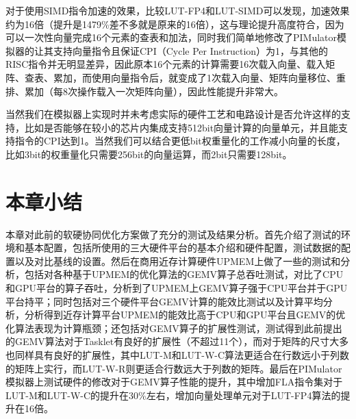 对于使用SIMD指令加速的效果，比较LUT-FP4和LUT-SIMD可以发现，加速效果约为16倍（提升是1479\%差不多就是原来的16倍），这与理论提升高度符合，因为可以一次性向量完成16个元素的查表和加法，同时我们简单地修改了PIMulator模拟器的让其支持向量指令且保证CPI（Cycle Per Instruction）为1，与其他的RISC指令并无明显差异，因此原本16个元素的计算需要16次载入向量、载入矩阵、查表、累加，而使用向量指令后，就变成了1次载入向量、矩阵向量移位、重排、累加（每8次操作载入一次矩阵向量），因此性能提升非常大。

当然我们在模拟器上实现时并未考虑实际的硬件工艺和电路设计是否允许这样的支持，比如是否能够在较小的芯片内集成支持512bit向量计算的向量单元，并且能支持指令的CPI达到1。当然我们可以结合更低bit权重量化的工作减小向量的长度，比如3bit的权重量化只需要256bit的向量运算，而2bit只需要128bit。

\section{本章小结}
本章对此前的软硬协同优化方案做了充分的测试及结果分析。首先介绍了测试的环境和基本配置，包括所使用的三大硬件平台的基本介绍和硬件配置，测试数据的配置以及对比基线的设置。然后在商用近存计算硬件UPMEM上做了一些的测试和分析，包括对各种基于UPMEM的优化算法的GEMV算子总吞吐测试，对比了CPU和GPU平台的算子吞吐，分析到了UPMEM上GEMV算子强于CPU平台并于GPU平台持平；同时包括对三个硬件平台GEMV计算的能效比测试以及计算平均分析，分析得到近存计算平台UPMEM的能效比高于CPU和GPU平台且GEMV的优化算法表现为计算瓶颈；还包括对GEMV算子的扩展性测试，测试得到此前提出的GEMV算法对于Tasklet有良好的扩展性（不超过11个），而对于矩阵的尺寸大多也同样具有良好的扩展性，其中LUT-M和LUT-W-C算法更适合在行数远小于列数的矩阵上实行，而LUT-W-R则更适合行数远大于列数的矩阵。最后在PIMulator模拟器上测试硬件的修改对于GEMV算子性能的提升，其中增加FLA指令集对于LUT-M和LUT-W-C的提升在30\%左右，增加向量处理单元对于LUT-FP4算法的提升在16倍。